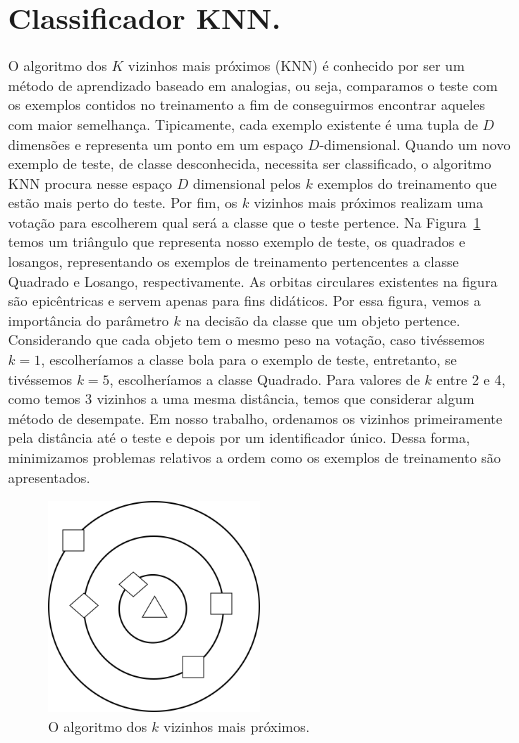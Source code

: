 \section{Classificador \textsc{KNN}.}
\label{subsec::cred_knn}


O algoritmo dos $K$ vizinhos mais próximos (\textsc{KNN}) é conhecido por ser um método de aprendizado baseado em analogias, ou seja, comparamos o teste com os exemplos contidos no treinamento a fim de conseguirmos encontrar aqueles com maior semelhança. 
Tipicamente, cada exemplo existente é uma tupla de $D$ dimensões e representa um ponto em um espaço $D$-dimensional. 
Quando um novo exemplo de teste, de classe desconhecida, necessita ser classificado, o algoritmo \textsc{KNN} procura nesse espaço $D$ dimensional pelos $k$ exemplos do treinamento que estão mais perto do teste. 
Por fim, os $k$ vizinhos mais próximos realizam uma votação para escolherem qual será a classe que o teste pertence.
Na Figura~\ref{fig::knn} temos um triângulo que representa nosso exemplo de teste, os quadrados e losangos, representando os exemplos de treinamento pertencentes a classe Quadrado e Losango, respectivamente. As orbitas circulares existentes na figura são epicêntricas e servem apenas para fins didáticos.
Por essa figura, vemos a importância do parâmetro $k$ na decisão da classe que um objeto pertence. Considerando que cada objeto tem o mesmo peso na votação, caso tivéssemos $k=1$, escolheríamos a classe bola para o exemplo de teste, entretanto, se tivéssemos $k=5$, escolheríamos a classe Quadrado. Para valores de $k$ entre 2 e 4, como temos 3 vizinhos a uma mesma distância, temos que considerar algum método de desempate. Em nosso trabalho, ordenamos os vizinhos primeiramente pela distância até o teste e depois por um identificador único. Dessa forma, minimizamos problemas relativos a ordem como os exemplos de treinamento são apresentados.

\begin{figure}[ht!]
\centering
\includegraphics[width=0.5\textwidth]{figures/knn.png}
\caption{O algoritmo dos $k$ vizinhos mais próximos.}
\label{fig::knn}
\end{figure}

